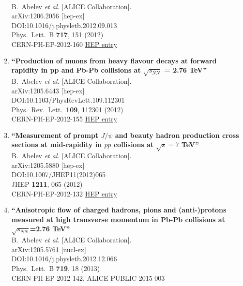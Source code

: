 \begin{enumerate}
  \\{}B.~Abelev {\it et al.} [ALICE Collaboration].
  \\{}arXiv:1206.2056 [hep-ex]
  \\{}DOI:10.1016/j.physletb.2012.09.013
  \\{}Phys.\ Lett.\ B {\bf 717}, 151 (2012)
  \\{}CERN-PH-EP-2012-160
\href{http://inspirehep.net/record/1117885}{HEP entry}
\item%
{\bf ``Production of muons from heavy flavour decays at forward rapidity in pp and Pb-Pb collisions at $\sqrt {s_{NN}}$ = 2.76 TeV''}
  \\{}B.~Abelev {\it et al.} [ALICE Collaboration].
  \\{}arXiv:1205.6443 [hep-ex]
  \\{}DOI:10.1103/PhysRevLett.109.112301
  \\{}Phys.\ Rev.\ Lett.\  {\bf 109}, 112301 (2012)
  \\{}CERN-PH-EP-2012-155
\href{http://inspirehep.net/record/1116417}{HEP entry}
\item%
{\bf ``Measurement of prompt $J/\psi$ and beauty hadron production cross sections at mid-rapidity in $pp$ collisions at $\sqrt{s} = 7$ TeV''}
  \\{}B.~Abelev {\it et al.} [ALICE Collaboration].
  \\{}arXiv:1205.5880 [hep-ex]
  \\{}DOI:10.1007/JHEP11(2012)065
  \\{}JHEP {\bf 1211}, 065 (2012)
  \\{}CERN-PH-EP-2012-132
\href{http://inspirehep.net/record/1116251}{HEP entry}
\item%
{\bf ``Anisotropic flow of charged hadrons, pions and (anti-)protons measured at high transverse momentum in Pb-Pb collisions at $\sqrt{s_{NN}}$=2.76 TeV''}
  \\{}B.~Abelev {\it et al.} [ALICE Collaboration].
  \\{}arXiv:1205.5761 [nucl-ex]
  \\{}DOI:10.1016/j.physletb.2012.12.066
  \\{}Phys.\ Lett.\ B {\bf 719}, 18 (2013)
  \\{}CERN-PH-EP-2012-142, ALICE-PUBLIC-2015-003

\end{enumerate}

